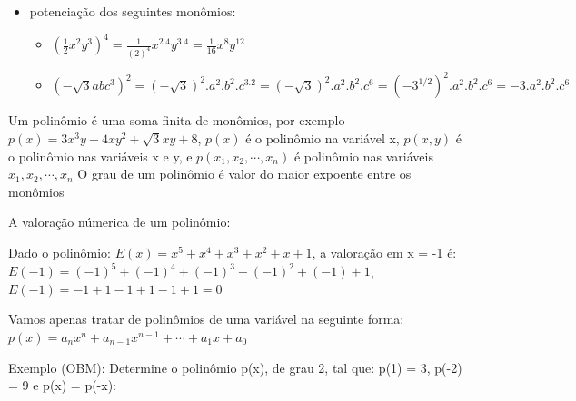 \begin{multicols*}{2}
\begin{itemize}
            
            \item potenciação dos seguintes monômios:
                \begin{itemize}
                    \item $\left(  \frac{1}{2} x^2y^3  \right)^4 = \frac{1}{(2)^4} x^{2.4}y^{3.4} = 								\frac{1}{16} x^8 y^{12}$
                    \item $( -\sqrt{3} a b c^3)^2 = 
                        (-\sqrt{3})^2.a^2.b^2.c^{3.2} = 												(-						\sqrt{3})^2.a^2.b^2.c^6 = (-3^{1/2})^2.a^2.b^2.c^{6} = 												-3.a^2.b^2.c^6$
                \end{itemize}
            
            \end{itemize}
            Um polinômio é uma soma finita de monômios, por exemplo 
            $p(x) = 3x^3y - 4xy^2 + \sqrt{3}xy + 8$, $p(x)$ é o polinômio na variável x, $p(x,y)$ é o 				polinômio nas variáveis x e y, e $p(x_1, x_2, \cdots, x_n)$ é polinômio nas variáveis $x_1, 			x_2, \cdots, x_n$
            O grau de um polinômio é valor do maior expoente entre os monômios
            
            A valoração númerica de um polinômio:
            
            Dado o polinômio: $E(x) = x^5 + x^4 + x^3 + x^2 + x + 1$, a valoração em x = -1 é:
            $E(-1) = (-1)^5 + (-1)^4 + (-1)^3 + (-1)^2 + (-1) + 1$,		
            $E(-1) = -1 + 1 - 1 + 1 -1 +1  = 0$
            
            Vamos apenas tratar de polinômios de uma variável na seguinte forma: 
            $p(x) = a_nx^n + a_{n-1}x^{n-1} + \cdots + a_1x + a_0$
            
            Exemplo (OBM):
            Determine o polinômio p(x), de grau 2, tal que: p(1) = 3, p(-2) = 9 e p(x) = p(-x):
            

\end{multicols*}
